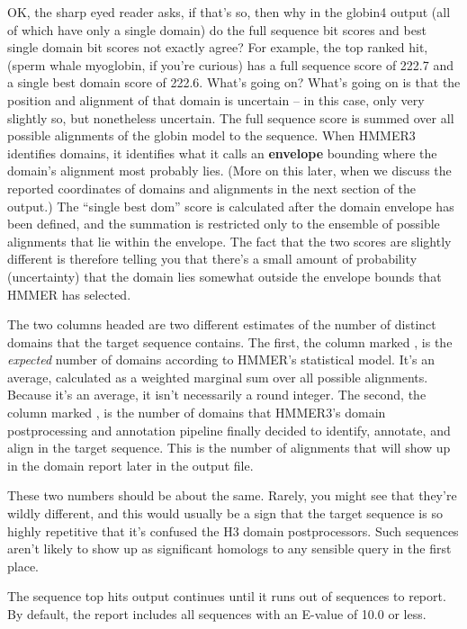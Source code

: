 OK, the sharp eyed reader asks, if that's so, then why in the globin4
output (all of which have only a single domain) do the full sequence
bit scores and best single domain bit scores not exactly agree? For
example, the top ranked hit,  (sperm whale myoglobin,
if you're curious) has a full sequence score of 222.7 and a single
best domain score of 222.6. What's going on? What's going on is that
the position and alignment of that domain is uncertain -- in this
case, only very slightly so, but nonetheless uncertain. The full
sequence score is summed over all possible alignments of the globin
model to the  sequence. When HMMER3 identifies
domains, it identifies what it calls an \textbf{envelope} bounding
where the domain's alignment most probably lies. (More on this later,
when we discuss the reported coordinates of domains and alignments in
the next section of the output.) The ``single best dom'' score is
calculated after the domain envelope has been defined, and the
summation is restricted only to the ensemble of possible alignments
that lie within the envelope. The fact that the two scores are
slightly different is therefore telling you that there's a small
amount of probability (uncertainty) that the domain lies somewhat
outside the envelope bounds that HMMER has selected.

The two columns headed  are two different estimates of
the number of distinct domains that the target sequence contains. The
first, the column marked , is the \emph{expected} number of
domains according to HMMER's statistical model. It's an average,
calculated as a weighted marginal sum over all possible
alignments. Because it's an average, it isn't necessarily a round
integer. The second, the column marked , is the number of
domains that HMMER3's domain postprocessing and annotation pipeline
finally decided to identify, annotate, and align in the target
sequence. This is the number of alignments that will show up in the
domain report later in the output file.

These two numbers should be about the same. Rarely, you might see that
they're wildly different, and this would usually be a sign that the
target sequence is so highly repetitive that it's confused the H3
domain postprocessors. Such sequences aren't likely to show up as
significant homologs to any sensible query in the first place.

The sequence top hits output continues until it runs out of sequences
to report. By default, the report includes all sequences with an
E-value of 10.0 or less. 

